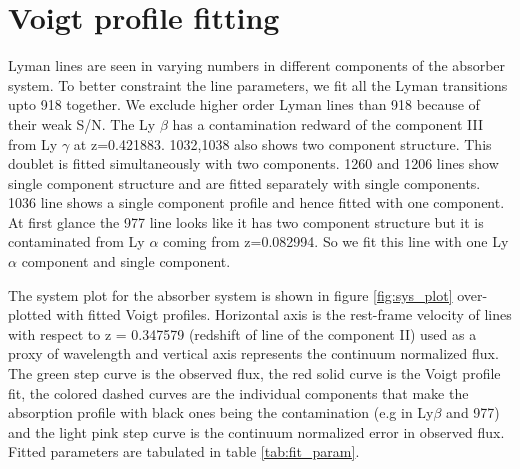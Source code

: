 \section{Voigt profile fitting} \label{sec:Voigt_fitting}

Lyman lines are seen in varying numbers in different components of the absorber system. To better constraint the line parameters, we fit all the Lyman transitions upto  918 together. We exclude higher order Lyman lines than  918 because of their weak S/N. The Ly $\beta$ has a contamination redward of the component III from Ly $\gamma$ at z=0.421883.  1032,1038 also shows two component structure. This doublet is fitted simultaneously with two components.  1260 and  1206 lines show single component structure and are fitted separately with single components.  1036 line shows a single component profile and hence fitted with one component. At first glance the  977 line looks like it has two component structure but it is contaminated from Ly $\alpha$ coming from z=0.082994. So we fit this line with one Ly $\alpha$ component and single  component. 

The system plot for the absorber system is shown in figure \ref{fig:sys_plot} over-plotted with fitted Voigt profiles. Horizontal axis is the rest-frame velocity of lines with respect to z = 0.347579 (redshift of  line of the component II) used as a proxy of wavelength and vertical axis represents the continuum normalized flux. The green step curve is the observed flux, the red solid curve is the Voigt profile fit, the colored dashed curves are the individual components that make the absorption profile with black ones being the contamination (e.g in Ly$\beta$ and  977) and the light pink step curve is the continuum normalized error in observed flux. Fitted parameters are tabulated in table \ref{tab:fit_param}.

